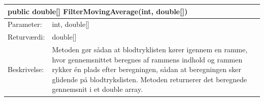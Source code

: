 \begin{table}[H]
\label{tab:tabel2}
\begin{tabular}{| l | p{13cm} |}
   \hline
   \multicolumn{2}{|l|}{public double[] FilterMovingAverage(int, double[])} \\ \hline
   Parameter: & int, double[]\\ \hline
   Returværdi: & double[]\\ \hline
   Beskrivelse: & Metoden gør sådan at blodtryklisten kører igennem en ramme, hvor gennemsnittet beregnes af rammens indhold og rammen rykker én plads efter beregningen, sådan at beregningen sker glidende på blodtrykslisten. Metoden returnerer det beregnede gennemsnit i et double array. \\ \hline
\end{tabular}
\end{table}

